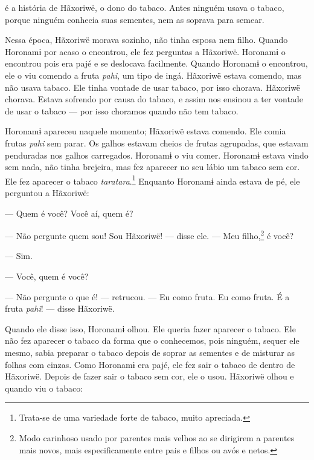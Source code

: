  é a história de Hãxoriwë, o dono do tabaco. Antes ninguém usava o
tabaco, porque ninguém conhecia suas sementes, nem as soprava para
semear. 


Nessa época, Hãxoriwë morava sozinho, não tinha esposa nem
filho. Quando Horonamɨ por acaso o encontrou, ele fez
perguntas a Hãxoriwë. Horonamɨ o encontrou pois era pajé e se deslocava
facilmente. Quando Horonamɨ o encontrou, ele o viu comendo a
fruta \textit{pahi}, um tipo de ingá. Hãxoriwë estava comendo, mas não
usava tabaco. Ele tinha vontade de usar tabaco, por isso chorava.
Hãxoriwë chorava. Estava sofrendo por causa do tabaco, e assim nos
ensinou a ter vontade de usar o tabaco --- por isso choramos quando não
tem tabaco. 

Horonamɨ apareceu naquele momento; Hãxoriwë estava comendo. Ele comia
frutas \textit{pahi} sem parar. Os galhos estavam cheios de frutas
agrupadas, que estavam penduradas nos galhos carregados. Horonamɨ o viu
comer. Horonamɨ estava vindo sem nada, não tinha brejeira, mas fez
aparecer no seu lábio um tabaco sem cor. Ele fez aparecer o
tabaco \textit{taratara}.\footnote{Trata-se de uma variedade forte de tabaco, muito apreciada.}  Enquanto Horonamɨ ainda estava
de pé, ele perguntou a Hãxoriwë: 

--- Quem é você? Você aí, quem é? 

--- Não pergunte quem sou! Sou Hãxoriwë! --- disse ele. --- Meu
filho,\footnote{Modo carinhoso usado por parentes mais velhos ao se dirigirem a
parentes mais novos, mais especificamente entre pais e filhos ou avós e
netos.} é você? 

--- Sim.

--- Você, quem é você?


--- Não pergunte o que é! --- retrucou. --- Eu como fruta. Eu como
fruta. É a fruta \textit{pahi}! --- disse Hãxoriwë. 

Quando ele disse isso, Horonamɨ olhou. Ele queria fazer aparecer o
tabaco. Ele não fez aparecer o tabaco da forma que o conhecemos, pois
ninguém, sequer ele mesmo, sabia preparar o tabaco depois de soprar as
sementes e de misturar as folhas com cinzas. Como Horonamɨ era pajé, ele
fez sair o tabaco de dentro de Hãxoriwë. Depois de fazer sair o tabaco
sem cor, ele o usou. Hãxoriwë olhou e quando viu o tabaco: 

